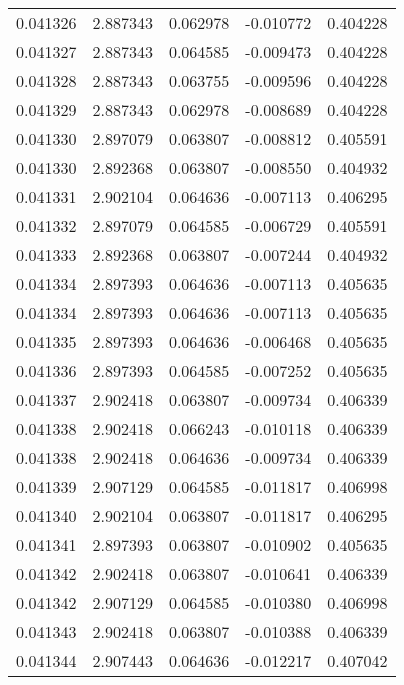 \begin{tabular}{lrrrr}
0.041326    &  2.887343 &  0.062978 & -0.010772 &             0.404228 \\
0.041327    &  2.887343 &  0.064585 & -0.009473 &             0.404228 \\
0.041328    &  2.887343 &  0.063755 & -0.009596 &             0.404228 \\
0.041329    &  2.887343 &  0.062978 & -0.008689 &             0.404228 \\
0.041330    &  2.897079 &  0.063807 & -0.008812 &             0.405591 \\
0.041330    &  2.892368 &  0.063807 & -0.008550 &             0.404932 \\
0.041331    &  2.902104 &  0.064636 & -0.007113 &             0.406295 \\
0.041332    &  2.897079 &  0.064585 & -0.006729 &             0.405591 \\
0.041333    &  2.892368 &  0.063807 & -0.007244 &             0.404932 \\
0.041334    &  2.897393 &  0.064636 & -0.007113 &             0.405635 \\
0.041334    &  2.897393 &  0.064636 & -0.007113 &             0.405635 \\
0.041335    &  2.897393 &  0.064636 & -0.006468 &             0.405635 \\
0.041336    &  2.897393 &  0.064585 & -0.007252 &             0.405635 \\
0.041337    &  2.902418 &  0.063807 & -0.009734 &             0.406339 \\
0.041338    &  2.902418 &  0.066243 & -0.010118 &             0.406339 \\
0.041338    &  2.902418 &  0.064636 & -0.009734 &             0.406339 \\
0.041339    &  2.907129 &  0.064585 & -0.011817 &             0.406998 \\
0.041340    &  2.902104 &  0.063807 & -0.011817 &             0.406295 \\
0.041341    &  2.897393 &  0.063807 & -0.010902 &             0.405635 \\
0.041342    &  2.902418 &  0.063807 & -0.010641 &             0.406339 \\
0.041342    &  2.907129 &  0.064585 & -0.010380 &             0.406998 \\
0.041343    &  2.902418 &  0.063807 & -0.010388 &             0.406339 \\
0.041344    &  2.907443 &  0.064636 & -0.012217 &             0.407042 \\

\end{tabular}
